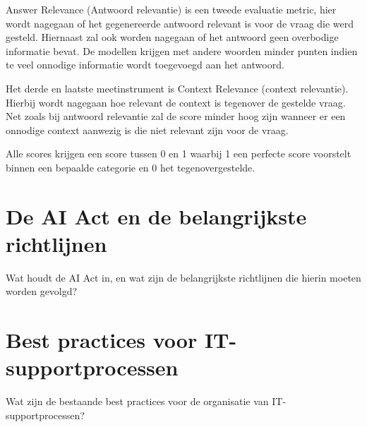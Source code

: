     Answer Relevance (Antwoord relevantie) is een tweede evaluatie metric, hier wordt nagegaan of het gegenereerde antwoord relevant is voor de vraag die werd gesteld. Hiernaast zal ook worden nagegaan of het antwoord geen overbodige informatie bevat.
    De modellen krijgen met andere woorden minder punten indien te veel onnodige informatie wordt toegevoegd aan het antwoord.
    
    Het derde en laatste meetinstrument is Context Relevance (context relevantie). Hierbij wordt nagegaan hoe relevant de context is tegenover de gestelde vraag. Net zoals bij antwoord relevantie zal de score minder hoog zijn wanneer er een onnodige context aanwezig is die niet relevant zijn voor de vraag.
    
    Alle scores krijgen een score tussen 0 en 1 waarbij 1 een perfecte score voorstelt binnen een bepaalde categorie en 0 het tegenovergestelde.

\section{De AI Act en de belangrijkste richtlijnen}
Wat houdt de AI Act in, en wat zijn de belangrijkste richtlijnen die hierin moeten worden gevolgd?

\section{Best practices voor IT-supportprocessen}
Wat zijn de bestaande best practices voor de organisatie van IT-supportprocessen?

